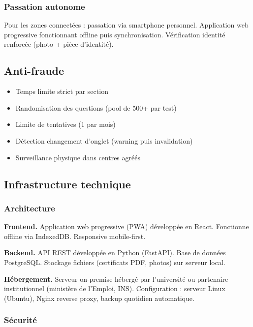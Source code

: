\documentclass[12pt]{article}
\begin{document}
\subsubsection{Passation autonome}

Pour les zones connectées : passation via smartphone personnel. Application web progressive fonctionnant offline puis synchronisation. Vérification identité renforcée (photo + pièce d'identité).

\subsection{Anti-fraude}

\begin{itemize}
    \item Temps limite strict par section
    \item Randomisation des questions (pool de 500+ par test)
    \item Limite de tentatives (1 par mois)
    \item Détection changement d'onglet (warning puis invalidation)
    \item Surveillance physique dans centres agréés
\end{itemize}

\subsection{Infrastructure technique}

\subsubsection{Architecture}

\textbf{Frontend.} Application web progressive (PWA) développée en React. Fonctionne offline via IndexedDB. Responsive mobile-first.

\textbf{Backend.} API REST développée en Python (FastAPI). Base de données PostgreSQL. Stockage fichiers (certificats PDF, photos) sur serveur local.

\textbf{Hébergement.} Serveur on-premise hébergé par l'université ou partenaire institutionnel (ministère de l'Emploi, INS). Configuration : serveur Linux (Ubuntu), Nginx reverse proxy, backup quotidien automatique.

\subsubsection{Sécurité}
\end{document}
